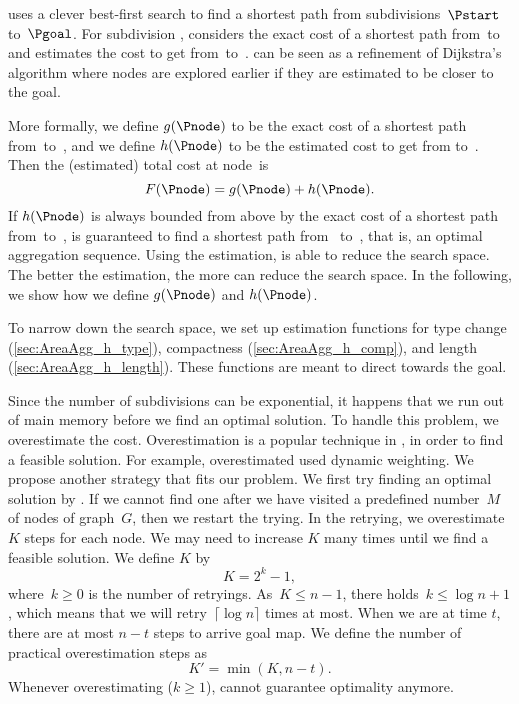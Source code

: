 \Astar uses a clever best-first search 
to find a shortest path 
from subdivisions~$\Pstart$ to~$\Pgoal$.  
For subdivision \Pnode,
\Astar considers the exact cost of a shortest path 
from~\Pstart to~\Pnode 
and estimates the cost to get from~\Pnode to~\Pgoal.  
\Astar can be seen as a refinement of Dijkstra's algorithm
where nodes are explored earlier 
if they are estimated to be closer to the goal.

More formally, we define $g(\Pnode)$ to be 
the exact cost of a shortest path from~\Pstart to~\Pnode, 
and we define $h(\Pnode)$ to be the estimated cost 
to get from \Pnode to~\Pgoal. 
Then the (estimated) total cost at node~\Pnode is
\begin{equation}
\label{eq:CostTotal}
F(\Pnode)=g(\Pnode)+h(\Pnode).
\end{equation}
If $h(\Pnode)$ is always bounded from above 
by the exact cost of a shortest path from~\Pnode to~\Pgoal, 
\Astar is guaranteed to find a shortest path from~\Pstart 
to~\Pgoal, 
that is, an optimal aggregation sequence.  
Using the estimation, \Astar is able to reduce the search space.
The better the estimation, the more \Astar can reduce the search 
space.
In the following, we show how we define $g(\Pnode)$ and 
$h(\Pnode)$.

To narrow down the search space, 
we set up estimation functions 
for type change (\sect\ref{sec:AreaAgg_h_type}), 
compactness (\sect\ref{sec:AreaAgg_h_comp}), 
and length (\sect\ref{sec:AreaAgg_h_length}). 
These functions are meant to direct \Astar towards the goal.

Since the number of subdivisions can be exponential, 
it happens that we run out of main memory 
before we find an optimal solution. 
To handle this problem, we overestimate the cost. 
Overestimation is a popular technique in \Astar,
in order to find a feasible solution. 
For example, \citet{Pohl1973} overestimated used dynamic 
weighting. 
We propose another strategy that fits our problem. 
We first try finding an optimal solution by \Astar. 
If we cannot find one after 
we have visited a predefined number~$M$ of nodes of graph~$G$,
then we restart the trying.
In the retrying, we overestimate $K$ steps for each node.
We may need to increase $K$ many times 
until we find a feasible solution.
We define $K$ by
\[
K= 2^k -1,
\]
where~$k\ge 0$ is the number of retryings.
As~$K \le n-1$, there holds~$k \le \log n +1$, 
which means  that we will 
retry~$\lceil \log n\rceil$ times at most.
When we are at time $t$, there are at most $n-t$ steps 
to arrive goal map.
We define the number of practical overestimation steps as
\[
K'= \min(K, n-t).
\]
Whenever overestimating ($k\geq1$), 
\Astar cannot guarantee optimality anymore.


